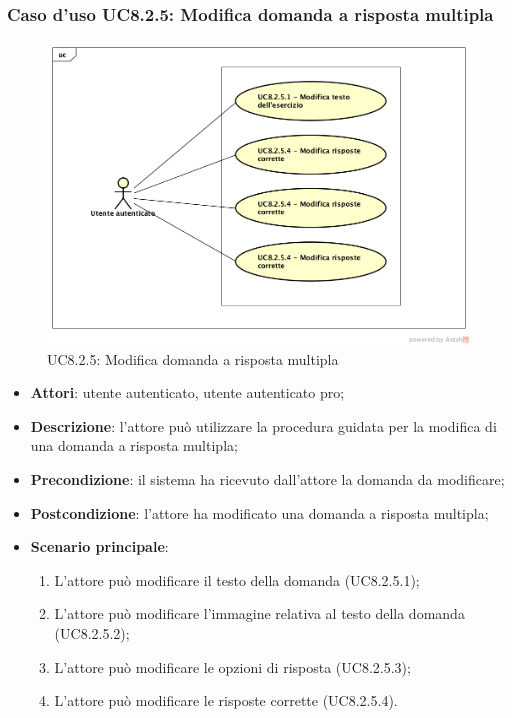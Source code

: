 \subsubsection{Caso d'uso UC8.2.5: Modifica domanda a risposta multipla}
	\label{UC8.2.5}
	\begin{figure}[h]
		\centering
			\includegraphics[scale=0.45,keepaspectratio]{UML/UC8_2_5.png}
		\caption{UC8.2.5: Modifica domanda a risposta multipla}
	\end{figure}
	\FloatBarrier
	\begin{itemize}
		\item
			\textbf{Attori}: utente autenticato, utente autenticato pro;
		\item		
			\textbf{Descrizione}: l'attore può utilizzare la procedura guidata per la modifica di una domanda a risposta multipla;
		\item
			\textbf{Precondizione}: il sistema ha ricevuto dall'attore la domanda da modificare;
		\item
			\textbf{Postcondizione}: l'attore ha modificato una domanda a risposta multipla;
		\item
			\textbf{Scenario principale}:
	       		\begin{enumerate}
	       			\item
	       			L'attore può modificare il testo della domanda (UC8.2.5.1);
	       			\item
	       			L'attore può modificare l'immagine relativa al testo della domanda (UC8.2.5.2);
	       			\item
	       			L'attore può modificare le opzioni di risposta (UC8.2.5.3);
					\item
					L'attore può modificare le risposte corrette (UC8.2.5.4).
	 			\end{enumerate}
	\end{itemize}

